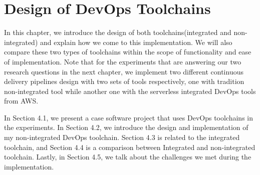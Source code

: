\chapter{Design of DevOps Toolchains}
In this chapter, we introduce the design of both toolchains(integrated and non-integrated) and explain how we come to this implementation. We will also compare these two types of toolchains within the scope of functionality and ease of implementation.
Note that for the experiments that are answering our two research questions in the next chapter, we implement two different continuous delivery pipelines design with two sets of tools respectively, one with tradition non-integrated tool while another one with the serverless integrated DevOps tools from AWS.
\par
In Section 4.1, we present a case software project that uses DevOps toolchains in the experiments. In Section 4.2, we introduce the design and implementation of my non-integrated DevOps toolchain. Section 4.3 is related to the integrated toolchain, and Section 4.4 is a comparison between Integrated and non-integrated toolchain. Lastly, in Section 4.5, we talk about the challenges we met during the implementation.
